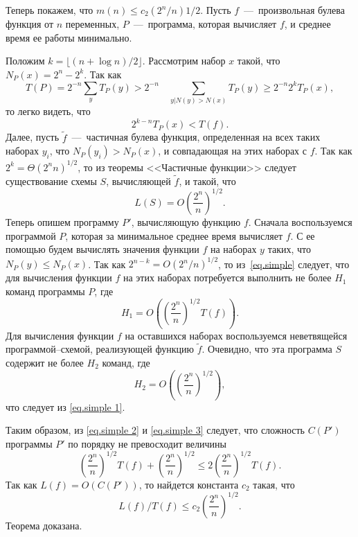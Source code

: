 \documentclass[12pt]{article}
\numberwithin{equation}{section}
\begin{document}
Теперь покажем, что
$m(n) \le c_2(2^n/n){1/2}$. Пусть
$f$~---~произвольная булева функция от $n$ переменных, $P$~---~программа, которая вычисляет
$f$, и среднее время ее работы минимально.

Положим $ k = \lfloor (n+\log n)/2 \rfloor $. Рассмотрим набор
$x$ такой, что $N_P(x) =
2^n - 2^k$. Так как
$$T(P) = 2^{-n}\sum_y T_P(y)>2^{-n} \quad \sum_{y | N(y)>N(x)}T_P(y)\ge2^{-n}2^k T_P(x),$$
то легко видеть, что
\begin{equation}
    2^{k-n}T_P(x)<T(f).\label{eq.simple}
\end{equation}
Далее, пусть $\tilde f$~---~частичная булева функция, определенная на всех таких наборах
$y_i$, что $N_P(y_i) > N_P(x)$, и совпадающая на этих наборах с
$f$. Так как $2^k = \Theta(2^n n)^{1/2}$, то из теоремы <<Частичные функции>> следует существование схемы $S$,
вычисляющей $\tilde f$, и такой, что
\begin{equation}L(S) = O \left(\frac{2^n}{n} \right)^{1/2}.
\label{eq.simple 1}\end{equation}
Теперь опишем программу $P'$, вычисляющую функцию $f$. Сначала воспользуемся программой $P$, которая за минимальное среднее время вычисляет $f$. С ее помощью будем вычислять значения функции $f$ на наборах $y$
таких, что $N_P(y) \le
N_P(x)$. Так как $2^{n-k} =
O\left(2^n/n\right)^{1/2}$, то из~\eqref{eq.simple} следует, что для вычисления функции $f$ на этих наборах потребуется выполнить не
более $H_1$ команд программы $P$, где
\begin{equation}H_1 = O\left( \left(\frac{2^n}{n} \right)^{1/2}T(f) \right).
\label{eq.simple 2}\end{equation}
Для вычисления функции $f$ на оставшихся наборах воспользуемся неветвящейся программой--схемой, реализующей функцию $\tilde f$. Очевидно, что эта программа $S$ содержит не более $H_2$ команд, где
\begin{equation}H_2 = O\left( \left(\frac{2^n}{n} \right)^{1/2} \right),
\label{eq.simple 3}\end{equation}
что следует из \eqref{eq.simple 1}.

Таким образом, из \eqref{eq.simple 2}
и \eqref{eq.simple 3} следует, что сложность
$C(P')$ программы $P'$ по порядку не превосходит величины
$$\left(\frac{2^n}{n} \right)^{1/2}T(f) + \left(\frac{2^n}{n} \right)^{1/2} \le 2\left(\frac{2^n}{n} \right)^{1/2}T(f). $$
Так как $L(f) =
O(C(P'))$, то найдется константа $c_2$ такая, что
$$L(f)/T(f)\le c_2 \left(\frac{2^n}{n} \right)^{1/2}.$$
Теорема доказана.
\end{document}

